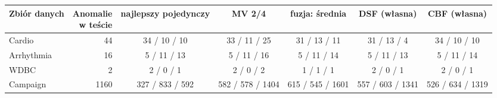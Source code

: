 \begin{tabular}{lrccccc}
\toprule
Zbiór danych & \makecell[r]{Anomalie\\w teście} & najlepszy pojedynczy & MV 2/4 & fuzja: średnia & DSF (własna) & CBF (własna) \\
\midrule
Cardio & 44 & 34 / 10 / 10 & 33 / 11 / 25 & 31 / 13 / 11 & 31 / 13 / 4 & 34 / 10 / 10 \\
Arrhythmia & 16 & 5 / 11 / 13 & 5 / 11 / 16 & 5 / 11 / 14 & 5 / 11 / 13 & 5 / 11 / 14 \\
WDBC & 2 & 2 / 0 / 1 & 2 / 0 / 2 & 1 / 1 / 1 & 2 / 0 / 1 & 2 / 0 / 1 \\
Campaign & 1160 & 327 / 833 / 592 & 582 / 578 / 1404 & 615 / 545 / 1601 & 557 / 603 / 1341 & 526 / 634 / 1319 \\
\bottomrule
\end{tabular}
